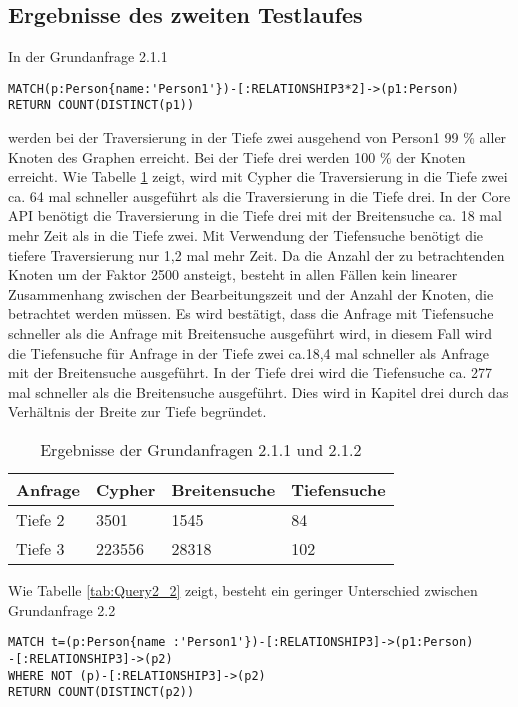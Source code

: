 \subsection{Ergebnisse des zweiten Testlaufes}
In der Grundanfrage 2.1.1
\begin{Verbatim}[frame=single]
MATCH(p:Person{name:'Person1'})-[:RELATIONSHIP3*2]->(p1:Person) 
RETURN COUNT(DISTINCT(p1))
\end{Verbatim}
 werden bei der Traversierung in der Tiefe zwei ausgehend von Person1 99 \% aller Knoten des Graphen erreicht. Bei der Tiefe drei werden 100 \% der Knoten erreicht. Wie Tabelle \ref{tab:Query2_1} zeigt, wird mit Cypher die Traversierung in die Tiefe zwei ca. 64 mal schneller ausgeführt als die Traversierung in die Tiefe drei. In der Core API benötigt die Traversierung in die Tiefe drei mit der Breitensuche ca. 18 mal mehr Zeit als in die Tiefe zwei. Mit Verwendung der Tiefensuche benötigt die tiefere Traversierung nur 1,2 mal mehr Zeit. Da die Anzahl der zu betrachtenden Knoten um der Faktor 2500 ansteigt, besteht in allen Fällen kein linearer Zusammenhang zwischen der Bearbeitungszeit und der Anzahl der Knoten, die betrachtet werden müssen. \newline 
Es wird bestätigt, dass die Anfrage mit Tiefensuche  schneller als die Anfrage mit Breitensuche ausgeführt wird, in diesem Fall wird die Tiefensuche für Anfrage in der Tiefe zwei ca.18,4 mal schneller als Anfrage mit der Breitensuche ausgeführt. In der Tiefe drei wird die Tiefensuche ca. 277 mal schneller als die Breitensuche ausgeführt. Dies wird in Kapitel drei durch das Verhältnis der Breite zur Tiefe begründet. 
\FloatBarrier
\begin{table}[h]
\centering
		\begin{tabular}{ |p{3cm}||p{3cm}|p{3cm}|p{3cm}|  }
			\hline
			Anfrage& Cypher & Breitensuche&Tiefensuche\\
			\hline
			Tiefe 2   & 3501    & 1545&   84\\
			Tiefe 3&    223556  & 28318   & 102\\
			\hline
		\end{tabular}
		\caption{Ergebnisse der Grundanfragen 2.1.1 und 2.1.2}
		\label{tab:Query2_1}
\end{table}
\FloatBarrier
\noindent Wie Tabelle \ref{tab:Query2_2} zeigt, besteht ein geringer Unterschied zwischen Grundanfrage 2.2
\begin{Verbatim}[frame=single]
MATCH t=(p:Person{name :'Person1'})-[:RELATIONSHIP3]->(p1:Person)
-[:RELATIONSHIP3]->(p2)
WHERE NOT (p)-[:RELATIONSHIP3]->(p2) 
RETURN COUNT(DISTINCT(p2))
\end{Verbatim} 
